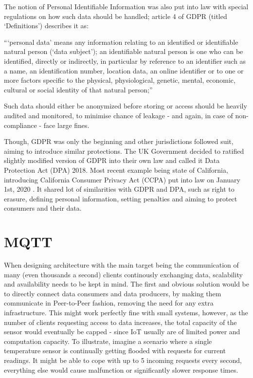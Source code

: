 The notion of Personal Identifiable Information was also put into law with special regulations on how such data should be handled; article 4 of GDPR (titled `Definitions') describes it as:
\begin{displayquote}
``‘personal data’ means any information relating to an identified or identifiable natural person (‘data subject’); an identifiable natural person is one who can be identified, directly or indirectly, in particular by reference to an identifier such as a name, an identification number, location data, an online identifier or to one or more factors specific to the physical, physiological, genetic, mental, economic, cultural or social identity of that natural person;''
\end{displayquote}
Such data should either be anonymized before storing or access should be heavily audited and monitored, to minimise chance of leakage - and again, in case of non-compliance - face large fines.

Though, GDPR was only the beginning and other jurisdictions followed suit, aiming to introduce similar protections. The UK Government decided to ratified slightly modified version of GDPR into their own law and called it Data Protection Act (DPA) 2018. Most recent example being state of California, introducing California Consumer Privacy Act (CCPA) put into law on January 1st, 2020 \citep{CCPA}. It shared lot of similarities with GDPR and DPA, such as right to erasure, defining personal information, setting penalties and aiming to protect consumers and their data.

\section{MQTT}
When designing architecture with the main target being the communication of many (even thousands a second) clients continously exchanging data, scalability and availability needs to be kept in mind. The first and obvious solution would be to directly connect data consumers and data producers, by making them communicate in Peer-to-Peer fashion, removing the need for any extra infrastructure. This might work perfectly fine with small systems, however, as the number of clients requesting access to data increases, the total capacity of the sensor would eventually be capped - since IoT usually are of limited power and computation capacity. To illustrate, imagine a scenario where a single temperature sensor is continually getting flooded with requests for current readings. It might be able to cope with  up to 5 incoming requests every second, everything else would cause malfunction or significantly slower response times.

